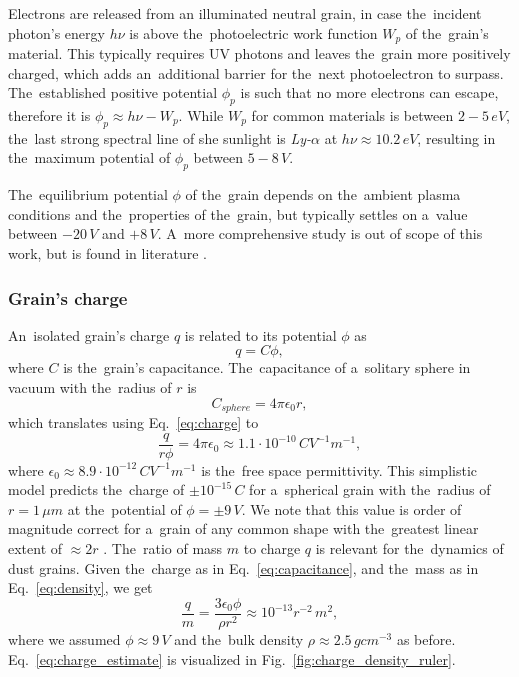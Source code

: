 Electrons are released from an illuminated neutral grain, in case the~incident photon's energy $h\nu$ is above the~photoelectric work function $W_{p}$ of the~grain's material. This typically requires UV photons and leaves the~grain more positively charged, which adds an~additional barrier for the~next photoelectron to surpass. The~established positive potential $\phi_{p}$ is such that no more electrons can escape, therefore it is $\phi_{p} \approx h\nu - W_{p}$. While $W_p$ for common materials is between $2 - 5 \, \si{eV}$, the~last strong spectral line of she sunlight is \textit{Ly-$\alpha$} at $h\nu \approx 10.2 \, \si{eV}$, resulting in the~maximum potential of $\phi_p$ between $5 - 8 \, \si{V}$. 

The~equilibrium potential $\phi$ of the~grain depends on the~ambient plasma conditions and the~properties of the~grain, but typically settles on a~value between $-20 \, \si{V}$ and $+8 \, \si{V}$. A~more comprehensive study is out of scope of this work, but is found in literature \citep{meyer1982flip,horanyi1996charged,krivov1998dynamics,dzhanoev2016charging,vaverka2016lunar}.

\subsubsection{Grain's charge}

An~isolated grain's charge $q$ is related to its potential $\phi$ as
\begin{equation}
    q = C \phi, \label{eq:charge}
\end{equation}
where $C$ is the~grain's capacitance. The~capacitance of a~solitary sphere in vacuum with the~radius of $r$ is 
\begin{equation}
    C_{sphere} = 4 \pi \epsilon_0 r,
\end{equation}
which translates using Eq.~\ref{eq:charge} to
\begin{equation}
    \frac{q}{r \phi} = 4 \pi \epsilon_0 \approx 1.1 \cdot 10^{-10} \, \si{C V^{-1} m^{-1}},
    \label{eq:capacitance}
\end{equation}
where $\epsilon_0 \approx 8.9\cdot10^{-12} \, \si{C V^{-1} m^{-1}}$ is the~free space permittivity. This simplistic model predicts the~charge of $\pm 10^{-15} \, \si{C}$ for a~spherical grain with the~radius of $r = 1 \, \si{\mu m}$ at the~potential of $\phi = \pm 9 \, \si{V}$. We note that this value is order of magnitude correct for a~grain of any common shape with the~greatest linear extent of $\approx 2r$ \citep{maxwell1877electrical}. The~ratio of mass $m$ to charge $q$ is relevant for the~dynamics of dust grains. Given the~charge as in Eq.~\ref{eq:capacitance}, and the~mass as in Eq.~\ref{eq:density}, we get
\begin{equation}
    \frac{q}{m} = \frac{3 \epsilon_0 \phi}{\rho r^2} \approx 10^{-13} r^{-2} \, \si{m^2},
    \label{eq:charge_estimate}
\end{equation}
where we assumed $\phi \approx 9 \, \si{V}$ and the~bulk density $\rho \approx 2.5 \, \si{g cm^{-3}}$ as before. Eq.~\ref{eq:charge_estimate} is visualized in Fig.~\ref{fig:charge_density_ruler}.

